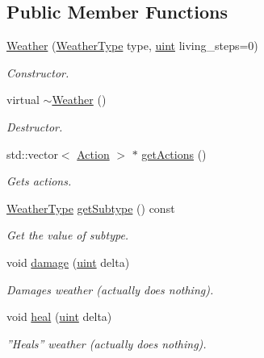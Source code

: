 \subsection*{Public Member Functions}
\begin{DoxyCompactItemize}
\item 
\hyperlink{classWeather_aecb2d4cf892c498e09bf9e8a00ae9cbd}{Weather} (\hyperlink{BasicTypes_8h_aae2a79ad426e847c0ddfd77d04ce2516}{Weather\-Type} type, \hyperlink{BasicTypes_8h_a91ad9478d81a7aaf2593e8d9c3d06a14}{uint} living\-\_\-steps=0)
\begin{DoxyCompactList}\small\item\em Constructor. \end{DoxyCompactList}\item 
virtual \hyperlink{classWeather_a6cc4f6ce440531f5c882547dcf40eb22}{$\sim$\-Weather} ()
\begin{DoxyCompactList}\small\item\em Destructor. \end{DoxyCompactList}\item 
std\-::vector$<$ \hyperlink{classAction}{Action} $>$ $\ast$ \hyperlink{classWeather_af6a985a031c55cc9d384fe532bbf69ef}{get\-Actions} ()
\begin{DoxyCompactList}\small\item\em Gets actions. \end{DoxyCompactList}\item 
\hyperlink{BasicTypes_8h_aae2a79ad426e847c0ddfd77d04ce2516}{Weather\-Type} \hyperlink{classWeather_ac2d3f1b253d6616c32a78310b8e05b9a}{get\-Subtype} () const 
\begin{DoxyCompactList}\small\item\em Get the value of subtype. \end{DoxyCompactList}\item 
void \hyperlink{classWeather_a2d2c127d06a55f388a80aedd07b6c2fb}{damage} (\hyperlink{BasicTypes_8h_a91ad9478d81a7aaf2593e8d9c3d06a14}{uint} delta)
\begin{DoxyCompactList}\small\item\em Damages weather (actually does nothing). \end{DoxyCompactList}\item 
void \hyperlink{classWeather_abe32b96dd46b0ce43b3b663a7b1de56c}{heal} (\hyperlink{BasicTypes_8h_a91ad9478d81a7aaf2593e8d9c3d06a14}{uint} delta)
\begin{DoxyCompactList}\small\item\em ''Heals'' weather (actually does nothing). \end{DoxyCompactList}\item 

\end{DoxyCompactItemize}
